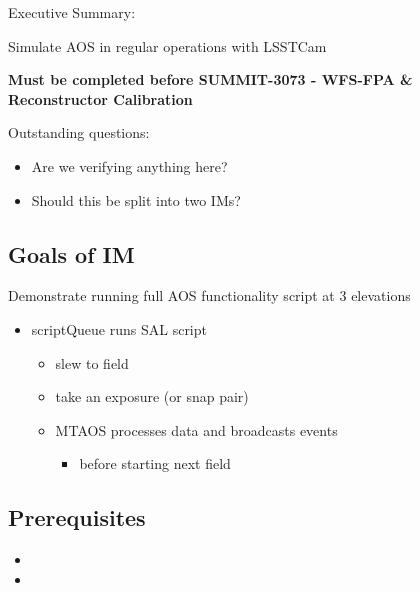 
Executive Summary:

Simulate AOS in regular operations with LSSTCam

\textbf{Must be completed before SUMMIT-3073 - WFS-FPA \& Reconstructor Calibration}

Outstanding questions:
\begin{itemize}
\item Are we verifying anything here?
\item Should this be split into two \glspl{IM}?
\end{itemize}

\subsection{Goals of IM}
Demonstrate running full \gls{AOS} functionality script at 3 elevations
\begin{itemize}
\item scriptQueue runs \gls{SAL} script
  \begin{itemize}
  \item slew to field
  \item take an exposure (or snap pair)
  \item \gls{MTAOS} processes data and broadcasts events
    \begin{itemize}
    \item before starting next field
    \end{itemize}
  \end{itemize}
\end{itemize}

\subsection{Prerequisites}

\begin{itemize}
\item {}
\item {}
\end{itemize}
